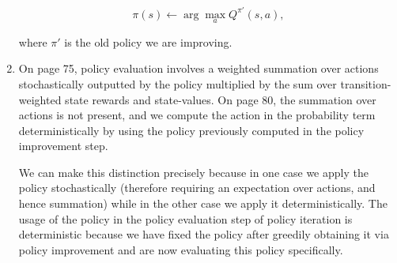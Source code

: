 \documentclass[
]{article}
\begin{document}
\begin{enumerate}
  \begin{equation}
    \pi(s) \leftarrow \arg\max_a Q^{\pi'}(s, a),
  \end{equation}

  where $\pi'$ is the old policy we are improving.
  
\item
  \par On page 75, policy evaluation involves a weighted summation over actions stochastically outputted
  by the policy multiplied by the sum over transition-weighted state rewards and state-values. On
  page 80, the summation over actions is not present, and we compute the action in the probability
  term deterministically by using the policy previously computed in the policy improvement step. 
  \par We can make this distinction precisely because in one case we apply the policy stochastically
  (therefore requiring an expectation over actions, and hence summation) while in the other case we
  apply it deterministically. The usage of the policy in the policy evaluation step of policy
  iteration is deterministic because we have fixed the policy after greedily obtaining it via policy
  improvement and are now evaluating this policy specifically.

\end{enumerate}
\end{document}
